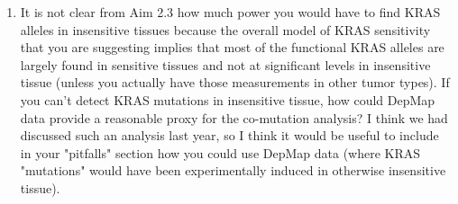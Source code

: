 {\begin{enumerate}
\item It is not clear from Aim 2.3 how much power you would have to find KRAS alleles in insensitive tissues because the overall model of KRAS sensitivity that you are suggesting implies that most of the functional KRAS alleles are largely found in sensitive tissues and not at significant levels in insensitive tissue (unless you actually have those measurements in other tumor types). If you can't detect KRAS mutations in insensitive tissue, how could DepMap data provide a reasonable proxy for the co-mutation analysis? I think we had discussed such an analysis last year, so I think it would be useful to include in your "pitfalls" section how you could use DepMap data (where KRAS "mutations" would have been experimentally induced in otherwise insensitive tissue). 

\end{enumerate}

}